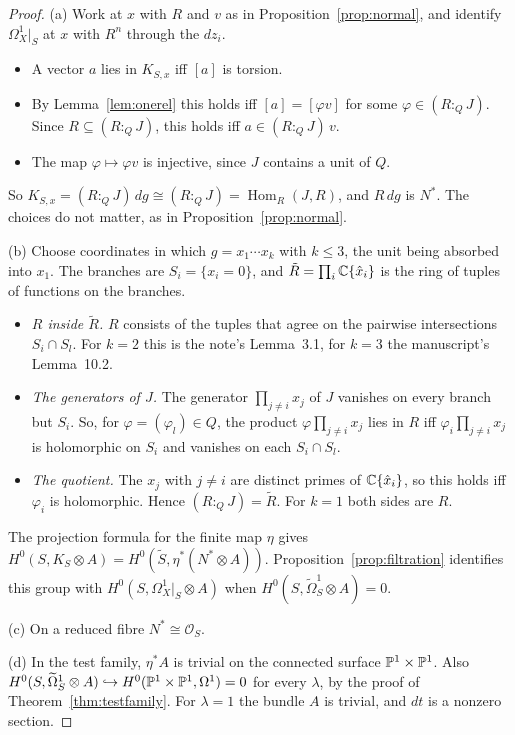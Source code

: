 \begin{proof}
(a) Work at $x$ with $R$ and $v$ as in Proposition~\ref{prop:normal}, and identify $\Omega^1_X|_S$ at $x$ with $R^n$ through the $dz_i$.
\begin{itemize}
\item A vector $a$ lies in $K_{S,x}$ iff $[a]$ is torsion.
\item By Lemma~\ref{lem:onerel} this holds iff $[a]=[\varphi v]$ for some $\varphi\in(R:_QJ)$. Since $R\subseteq(R:_QJ)$, this holds iff $a\in(R:_QJ)\,v$.
\item The map $\varphi\mapsto\varphi v$ is injective, since $J$ contains a unit of $Q$.
\end{itemize}
So $K_{S,x}=(R:_QJ)\,dg\cong(R:_QJ)=\operatorname{Hom}_R(J,R)$, and $R\,dg$ is $N^*$. The choices do not matter, as in Proposition~\ref{prop:normal}.

(b) Choose coordinates in which $g=x_1\cdots x_k$ with $k\le3$, the unit being absorbed into $x_1$. The branches are $S_i=\{x_i=0\}$, and $\tilde R=\prod_i\mathbb{C}\{\hat x_i\}$ is the ring of tuples of functions on the branches.
\begin{itemize}
\item \emph{$R$ inside $\tilde R$.} $R$ consists of the tuples that agree on the pairwise intersections $S_i\cap S_l$. For $k=2$ this is the note's Lemma~3.1, for $k=3$ the manuscript's Lemma~10.2.
\item \emph{The generators of $J$.} The generator $\prod_{j\ne i}x_j$ of $J$ vanishes on every branch but $S_i$. So, for $\varphi=(\varphi_l)\in Q$, the product $\varphi\prod_{j\ne i}x_j$ lies in $R$ iff $\varphi_i\prod_{j\ne i}x_j$ is holomorphic on $S_i$ and vanishes on each $S_i\cap S_l$.
\item \emph{The quotient.} The $x_j$ with $j\ne i$ are distinct primes of $\mathbb{C}\{\hat x_i\}$, so this holds iff $\varphi_i$ is holomorphic. Hence $(R:_QJ)=\tilde R$. For $k=1$ both sides are $R$.
\end{itemize}
The projection formula for the finite map $\eta$ gives $H^0(S,K_S\otimes A)=H^0(\tilde S,\eta^*(N^*\otimes A))$. Proposition~\ref{prop:filtration} identifies this group with $H^0(S,\Omega^1_X|_S\otimes A)$ when $H^0(S,\widetilde\Omega^1_S\otimes A)=0$.

(c) On a reduced fibre $N^*\cong\mathcal O_S$.

(d) In the test family, $\eta^*A$ is trivial on the connected surface $\mathbb{P}^1\times\mathbb{P}^1$. Also $H^0(S,\widetilde\Omega^1_S\otimes A)\hookrightarrow H^0(\mathbb{P}^1\times\mathbb{P}^1,\Omega^1)=0$ for every $\lambda$, by the proof of Theorem~\ref{thm:testfamily}. For $\lambda=1$ the bundle $A$ is trivial, and $dt$ is a nonzero section.
\end{proof}

